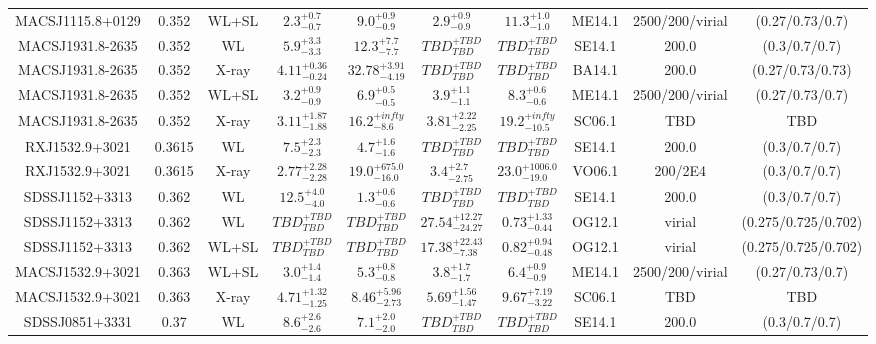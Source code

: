 \begin{table}
\begin{tabular}{cccccccccc}
MACSJ1115.8+0129 & 0.352 & WL+SL & ${2.3}^{+0.7}_{-0.7}$ & ${9.0}^{+0.9}_{-0.9}$ & ${2.9}^{+0.9}_{-0.9}$ & ${11.3}^{+1.0}_{-1.0}$ & ME14.1 & 2500/200/virial & (0.27/0.73/0.7) \\
MACSJ1931.8-2635 & 0.352 & WL & ${5.9}^{+3.3}_{-3.3}$ & ${12.3}^{+7.7}_{-7.7}$ & ${TBD}^{+TBD}_{TBD}$ & ${TBD}^{+TBD}_{TBD}$ & SE14.1 & 200.0 & (0.3/0.7/0.7) \\
MACSJ1931.8-2635 & 0.352 & X-ray & ${4.11}^{+0.36}_{-0.24}$ & ${32.78}^{+3.91}_{-4.19}$ & ${TBD}^{+TBD}_{TBD}$ & ${TBD}^{+TBD}_{TBD}$ & BA14.1 & 200.0 & (0.27/0.73/0.73) \\
MACSJ1931.8-2635 & 0.352 & WL+SL & ${3.2}^{+0.9}_{-0.9}$ & ${6.9}^{+0.5}_{-0.5}$ & ${3.9}^{+1.1}_{-1.1}$ & ${8.3}^{+0.6}_{-0.6}$ & ME14.1 & 2500/200/virial & (0.27/0.73/0.7) \\
MACSJ1931.8-2635 & 0.352 & X-ray & ${3.11}^{+1.87}_{-1.88}$ & ${16.2}^{+infty}_{-8.6}$ & ${3.81}^{+2.22}_{-2.25}$ & ${19.2}^{+infty}_{-10.5}$ & SC06.1 & TBD & TBD \\
RXJ1532.9+3021 & 0.3615 & WL & ${7.5}^{+2.3}_{-2.3}$ & ${4.7}^{+1.6}_{-1.6}$ & ${TBD}^{+TBD}_{TBD}$ & ${TBD}^{+TBD}_{TBD}$ & SE14.1 & 200.0 & (0.3/0.7/0.7) \\
RXJ1532.9+3021 & 0.3615 & X-ray & ${2.77}^{+2.28}_{-2.28}$ & ${19.0}^{+675.0}_{-16.0}$ & ${3.4}^{+2.7}_{-2.75}$ & ${23.0}^{+1006.0}_{-19.0}$ & VO06.1 & 200/2E4 & (0.3/0.7/0.7) \\
SDSSJ1152+3313 & 0.362 & WL & ${12.5}^{+4.0}_{-4.0}$ & ${1.3}^{+0.6}_{-0.6}$ & ${TBD}^{+TBD}_{TBD}$ & ${TBD}^{+TBD}_{TBD}$ & SE14.1 & 200.0 & (0.3/0.7/0.7) \\
SDSSJ1152+3313 & 0.362 & WL & ${TBD}^{+TBD}_{TBD}$ & ${TBD}^{+TBD}_{TBD}$ & ${27.54}^{+12.27}_{-24.27}$ & ${0.73}^{+1.33}_{-0.44}$ & OG12.1 & virial & (0.275/0.725/0.702) \\
SDSSJ1152+3313 & 0.362 & WL+SL & ${TBD}^{+TBD}_{TBD}$ & ${TBD}^{+TBD}_{TBD}$ & ${17.38}^{+22.43}_{-7.38}$ & ${0.82}^{+0.94}_{-0.48}$ & OG12.1 & virial & (0.275/0.725/0.702) \\
MACSJ1532.9+3021 & 0.363 & WL+SL & ${3.0}^{+1.4}_{-1.4}$ & ${5.3}^{+0.8}_{-0.8}$ & ${3.8}^{+1.7}_{-1.7}$ & ${6.4}^{+0.9}_{-0.9}$ & ME14.1 & 2500/200/virial & (0.27/0.73/0.7) \\
MACSJ1532.9+3021 & 0.363 & X-ray & ${4.71}^{+1.32}_{-1.25}$ & ${8.46}^{+5.96}_{-2.73}$ & ${5.69}^{+1.56}_{-1.47}$ & ${9.67}^{+7.19}_{-3.22}$ & SC06.1 & TBD & TBD \\
SDSSJ0851+3331 & 0.37 & WL & ${8.6}^{+2.6}_{-2.6}$ & ${7.1}^{+2.0}_{-2.0}$ & ${TBD}^{+TBD}_{TBD}$ & ${TBD}^{+TBD}_{TBD}$ & SE14.1 & 200.0 & (0.3/0.7/0.7) \\

\end{tabular}
\end{table}
